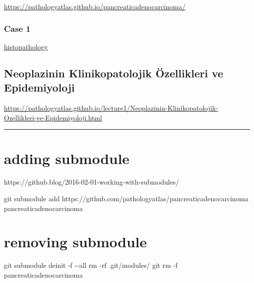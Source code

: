 \documentclass[
  letterpaper,
  DIV=11,
  numbers=noendperiod]{scrreprt}
\newenvironment{Shaded}{}{}
\newcommand{\AttributeTok}[1]{\textcolor[rgb]{0.84,0.23,0.29}{#1}}
\newcommand{\FunctionTok}[1]{\textcolor[rgb]{0.44,0.26,0.76}{#1}}
\newcommand{\NormalTok}[1]{\textcolor[rgb]{0.14,0.16,0.18}{#1}}
\begin{document}
\url{https://pathologyatlas.github.io/pancreaticadenocarcinoma/}

\hypertarget{case-1}{%
\subsection{Case 1}\label{case-1}}

\href{https://pathologyatlas.github.io/pancreaticadenocarcinoma/case1-histopathology/viewer_z0.html}{histopathology}

\hypertarget{neoplazinin-klinikopatolojik-uxf6zellikleri-ve-epidemiyoloji}{%
\section{Neoplazinin Klinikopatolojik Özellikleri ve
Epidemiyoloji}\label{neoplazinin-klinikopatolojik-uxf6zellikleri-ve-epidemiyoloji}}

\url{https://pathologyatlas.github.io/lecture1/Neoplazinin-Klinikopatolojik-Ozellikleri-ve-Epidemiyoloji.html}

\begin{center}\rule{0.5\linewidth}{0.5pt}\end{center}

\hypertarget{adding-submodule}{%
\chapter{adding submodule}\label{adding-submodule}}

https://github.blog/2016-02-01-working-with-submodules/

\begin{Shaded}
\begin{Highlighting}[]
\FunctionTok{git}\NormalTok{ submodule add https://github.com/pathologyatlas/pancreaticadenocarcinoma pancreaticadenocarcinoma}
\end{Highlighting}
\end{Shaded}

\hypertarget{removing-submodule}{%
\chapter{removing submodule}\label{removing-submodule}}

\begin{Shaded}
\begin{Highlighting}[]
\FunctionTok{git}\NormalTok{ submodule deinit }\AttributeTok{{-}f} \AttributeTok{{-}{-}all}
\FunctionTok{rm} \AttributeTok{{-}rf}\NormalTok{ .git/modules/}
\FunctionTok{git}\NormalTok{ rm }\AttributeTok{{-}f}\NormalTok{ pancreaticadenocarcinoma}
\end{Highlighting}
\end{Shaded}
\end{document}
